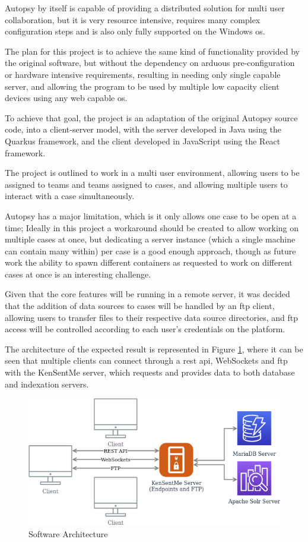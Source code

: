 Autopsy by itself is capable of providing a distributed solution for multi user collaboration, but it is very resource intensive, requires many complex configuration steps
and is also only fully supported on the Windows \acrshort{os}.

The plan for this project is to achieve the same kind of functionality provided by the original software, but without the dependency on arduous pre-configuration
or hardware intensive requirements, resulting in needing only single capable server, and allowing the program to be used by multiple low capacity client devices using 
any web capable \acrshort{os}.

To achieve that goal, the project is an adaptation of the original Autopsy source code, into a client-server model, with the server developed in Java using the Quarkus \cite{quarkus} framework,
and the client developed in JavaScript using the React \cite{react} framework.

The project is outlined to work in a multi user environment, allowing users to be assigned to teams and teams assigned to cases, and allowing multiple users to interact with
a case simultaneously.

Autopsy has a major limitation, which is it only allows one case to be open at a time; Ideally in this project a workaround should be created to allow working on multiple cases
at once, but dedicating a server instance (which a single machine can contain many within) per case is a good enough approach, though as future work the
ability to spawn different containers as requested to work on different cases at once is an interesting challenge.

Given that the core features will be running in a remote server, it was decided that the addition of data sources to cases will be handled by an \acrshort{ftp} client, allowing users
to transfer files to their respective data source directories, and \acrshort{ftp} access will be controlled according to each user's credentials on the platform.

The architecture of the expected result is represented in Figure \ref{fig:arch}, where it can be seen that multiple clients can connect through a \acrshort{rest} \acrshort{api}, WebSockets and \acrshort{ftp} with the KenSentMe server, 
which requests and provides data to both database and indexation servers.

\begin{figure}[ht]
 \centering
 \includegraphics[width=0.75\linewidth]{imgs/arch.png}
 \caption{Software Architecture}
 \label{fig:arch}
\end{figure}

